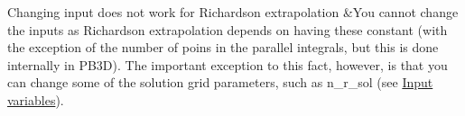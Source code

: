 \begin{longtabu}
Changing input does not work for Richardson extrapolation &You cannot change the inputs as Richardson extrapolation depends on having these constant (with the exception of the number of poins in the parallel integrals, but this is done internally in P\+B3D). The important exception to this fact, however, is that you can change some of the solution grid parameters, such as {\ttfamily n\+\_\+r\+\_\+sol} (see \hyperlink{page_inputs}{Input variables}).   \\
\end{longtabu}
